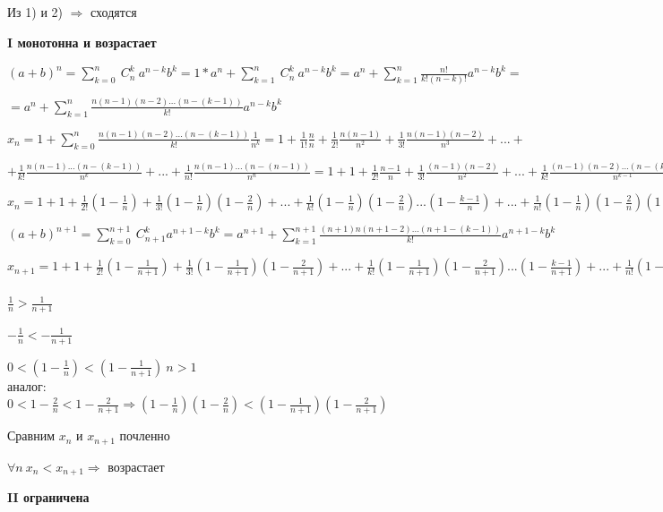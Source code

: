 \documentclass{article}
\begin{document}
    Из 1) и 2) \( \Rightarrow \) сходятся

    \textbf{I монотонна и возрастает}

    \((a+b)^n = \sum_{k=0}^n\ C^k_n \ a^{n-k}b^k=1*a^n+\sum_{k=1}^n\ C^k_n \ a^{n-k}b^k = a^n+\sum_{k=1}^n \frac{n!}{k!(n-k)!} a^{n-k}b^k = \)

    \( = a^n + \sum_{k=1}^n \frac{n(n-1)(n-2)...(n-(k-1))}{k!} a^{n-k} b^k\)

    \( x_n = 1 + \sum_{k=0}^n \frac{n(n-1)(n-2)...(n-(k-1))}{k!} \frac{1}{n^k} = 1 + \frac{1}{1!} \frac{n}{n} + \frac{1}{2!} \frac{n(n-1)}{n^2} + \frac{1}{3!} \frac{n(n-1)(n-2)}{n^3} + ... + \)

    \( + \frac{1}{k!} \frac{n(n-1)...(n-(k-1))}{n^k} + ... + \frac{1}{n!} \frac{n(n-1)...(n-(n-1))}{n^n} = 1 + 1 + \frac{1}{2!} \frac{n-1}{n} + \frac{1}{3!} \frac{(n-1)(n-2)}{n^2} + ... + \frac{1}{k!} \frac{(n-1)(n-2)...(n-(k-1))}{n^{k-1}} + ... +\)

    \(x_n = 1+1+\frac{1}{2!}(1-\frac{1}{n})+\frac{1}{3!}(1-\frac{1}{n})(1-\frac{2}{n})+...+\frac{1}{k!}(1-\frac{1}{n})(1-\frac{2}{n})...(1-\frac{k-1}{n}) + ... + \frac{1}{n!} (1 - \frac{1}{n})(1 - \frac{2}{n})(1 - \frac{n-1}{n})\)

    \((a+b)^{n+1} = \sum_{k=0}^{n+1}\ C_{n+1}^k a^{n+1-k} b^k = a^{n+1} + \sum_{k=1}^{n+1} \frac{(n+1)n(n+1-2)...(n+1-(k-1))}{k!} a^{n+1-k} b^k\)

    \(x_{n+1} = 1 + 1 + \frac{1}{2!}(1-\frac{1}{n+1}) + \frac{1}{3!}(1-\frac{1}{n+1})(1-\frac{2}{n+1})+...+\frac{1}{k!}(1-\frac{1}{n+1})(1-\frac{2}{n+1})...(1-\frac{k-1}{n+1})+...+\frac{1}{n!}(1-\frac{1}{n+1})(1-\frac{2}{n+1})...(1-\frac{n-1}{n+1}) + \underbrace{\frac{1}{(n+1)!}(1-\frac{1}{n+1})(1-\frac{2}{n+1})...(1-\frac{n}{n+1})}_{> 0}\)\\

    \(\frac{1}{n} > \frac{1}{n+1}\)

    \(-\frac{1}{n} < -\frac{1}{n+1}\)

    \(0 < (1-\frac{1}{n}) < (1-\frac{1}{n+1})\ n > 1\) 
    \\аналог: \\\(0 < 1-\frac{2}{n} < 1-\frac{2}{n+1} \Rightarrow (1-\frac{1}{n})(1-\frac{2}{n}) < (1 - \frac{1}{n+1})(1 - \frac{2}{n+1})\)
    
    Сравним \(x_n\) и \(x_{n+1}\) почленно
    
    \(\forall n \ x_n < x_{n+1} \Rightarrow\) возрастает

    \textbf{II ограничена}
\end{document}
